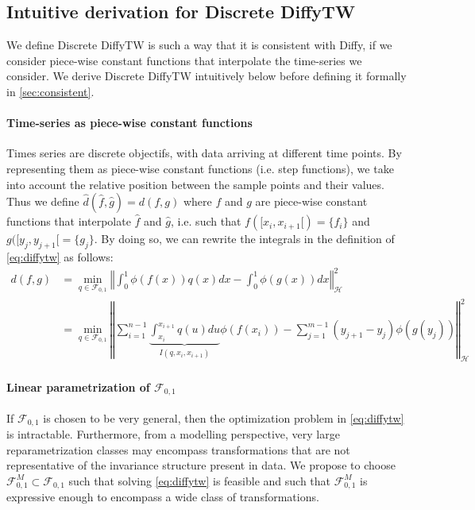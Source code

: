 \subsection{Intuitive derivation for Discrete DiffyTW}
We define Discrete DiffyTW is such a way that it is consistent with Diffy, if we consider piece-wise constant functions that interpolate the time-series we consider. We derive Discrete DiffyTW intuitively below before defining it formally in \cref{sec:consistent}.

\paragraph{Time-series as piece-wise constant functions} Times series are discrete objectifs, with data arriving at different time points. By representing them as piece-wise constant functions (i.e. step functions), we take into account the relative position between the sample points and their values. %
Thus we define $\hat d(\hat f, \hat g) =d(f, g)$ where $f$ and $g$ are piece-wise constant functions that interpolate $\hat f$ and $\hat g$, i.e. such that $f([x_i, x_{i+1}[)=\lbrace f_i\rbrace$ and $g([y_j, y_{j+1}[ = \lbrace g_j \rbrace$. By doing so, we can rewrite the integrals in the definition of \cref{eq:diffytw} as follows:
\begin{align}
    d(f, g) &= \min_{q \in \mathcal F_{0,1}}\left\Vert \int_0^1 \phi(f(x))q(x)dx - \int_0^1\phi(g(x))dx\right\Vert^2_\mathcal H\label{eq:diffytw-step-1}\\
            &\label{eq:diffytw-step-2}= \min_{q\in\mathcal F_{0,1}} \left \Vert \sum_{i=1}^{n-1} \underbrace{\int_{x_i}^{x_{i+1}}q(u)du}_{I(q, x_i, x_{i+1})} \phi(f(x_i)) - \sum_{j=1}^{m-1} (y_{j+1} - y_j)\phi(g(y_j))\right\Vert_\mathcal H^2
\end{align}

\paragraph{Linear parametrization of $\mathcal F_{0,1}$} If $\mathcal F_{0,1}$ is chosen to be very general, then the optimization problem in \cref{eq:diffytw} is intractable. Furthermore, from a modelling perspective, very large reparametrization classes may encompass transformations that are not representative of the invariance structure present in data. We propose to choose $\mathcal F_{0,1}^M\subset \mathcal F_{0,1}$ such that solving \cref{eq:diffytw} is feasible and such that $\mathcal F_{0,1}^M$ is expressive enough to encompass a wide class of transformations.

